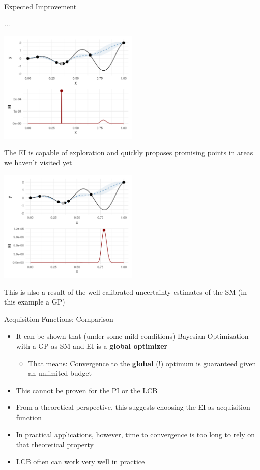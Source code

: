 \documentclass[11pt,compress,t,notes=noshow, xcolor=table]{beamer}
\begin{document}
\begin{vbframe}{Expected Improvement}
\framebreak

...

\begin{center}
  \includegraphics[width = 0.5\textwidth]{figure_man/bayesian_loop_5.png}
\end{center}

\framebreak

The EI is capable of exploration and quickly proposes promising points in areas we haven't visited yet

\begin{center}
  \includegraphics[width = 0.5\textwidth]{figure_man/bayesian_loop_6.png}
\end{center}

This is also a result of the well-calibrated uncertainty estimates of the SM (in this example a GP)

\end{vbframe}

\begin{vbframe}{Acquisition Functions: Comparison}

\begin{itemize}
  \item It can be shown that (under some mild conditions) Bayesian Optimization with a GP as SM and EI is a \textbf{global optimizer}
  \begin{itemize}
    \item That means: Convergence to the \textbf{global} (!) optimum is guaranteed given an unlimited budget
  \end{itemize}
  \item This cannot be proven for the PI or the LCB
  \item From a theoretical perspective, this suggests choosing the EI as acquisition function
  \item In practical applications, however, time to convergence is too long to rely on that theoretical property
  \item LCB often can work very well in practice
\end{itemize}

\end{vbframe}
\end{document}
